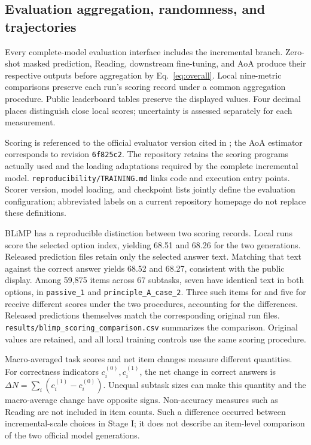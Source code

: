 \subsection{Evaluation aggregation, randomness, and trajectories}
\label{app:evaluation}

Every complete-model evaluation interface includes the incremental branch. Zero-shot masked prediction, Reading, downstream fine-tuning, and AoA produce their respective outputs before aggregation by Eq.~\eqref{eq:overall}. Local nine-metric comparisons preserve each run's scoring record under a common aggregation procedure. Public leaderboard tables preserve the displayed values. Four decimal places distinguish close local scores; uncertainty is assessed separately for each measurement.

Scoring is referenced to the official evaluator version cited in \citet{babylm2026evaluation}; the AoA estimator corresponds to revision \texttt{6f825c2}. The repository retains the scoring programs actually used and the loading adaptations required by the complete incremental model. \nolinkurl{reproducibility/TRAINING.md} links code and execution entry points. Scorer version, model loading, and checkpoint lists jointly define the evaluation configuration; abbreviated labels on a current repository homepage do not replace these definitions.

BLiMP has a reproducible distinction between two scoring records. Local runs score the selected option index, yielding 68.51 and 68.26 for the two generations. Released prediction files retain only the selected answer text. Matching that text against the correct answer yields 68.52 and 68.27, consistent with the public display. Among 59,875 items across 67 subtasks, seven have identical text in both options, in \texttt{passive\_1} and \texttt{principle\_A\_case\_2}. Three such items for \Frontier{} and five for \Guided{} receive different scores under the two procedures, accounting for the differences. Released predictions themselves match the corresponding original run files. \nolinkurl{results/blimp_scoring_comparison.csv} summarizes the comparison. Original values are retained, and all local training controls use the same scoring procedure.

Macro-averaged task scores and net item changes measure different quantities. For correctness indicators $c_i^{(0)},c_i^{(1)}$, the net change in correct answers is $\Delta N=\sum_i(c_i^{(1)}-c_i^{(0)})$. Unequal subtask sizes can make this quantity and the macro-average change have opposite signs. Non-accuracy measures such as Reading are not included in item counts. Such a difference occurred between incremental-scale choices in Stage I; it does not describe an item-level comparison of the two official model generations.

